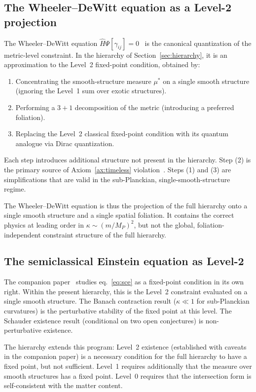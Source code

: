 \documentclass[12pt,a4paper]{article}
\theoremstyle{definition}
\theoremstyle{remark}
\begin{document}
\subsection{The Wheeler--DeWitt equation as a Level-2 projection}

The Wheeler--DeWitt equation $\hat{H}\Psi[\gamma_{ij}] = 0$~\cite{dewitt} is
the canonical quantization of the metric-level constraint. In the hierarchy of
Section~\ref{sec:hierarchy}, it is an approximation to the Level~2 fixed-point
condition, obtained by:

\begin{enumerate}
\item Concentrating the smooth-structure measure $\mu^*$ on a single smooth
structure (ignoring the Level~1 sum over exotic structures).
\item Performing a $3+1$ decomposition of the metric (introducing a preferred
foliation).
\item Replacing the Level~2 classical fixed-point condition with its quantum
analogue via Dirac quantization.
\end{enumerate}

Each step introduces additional structure not present in the hierarchy. Step (2)
is the primary source of Axiom~\ref{ax:timeless} violation~\cite{kuchar}.
Steps (1) and (3) are simplifications
that are valid in the sub-Planckian, single-smooth-structure regime.

The Wheeler--DeWitt equation is thus the projection of the full hierarchy onto
a single smooth structure and a single spatial foliation. It contains the
correct physics at leading order in $\kappa \sim (m/M_P)^2$, but not the
global, foliation-independent constraint structure of the full hierarchy.

\subsection{The semiclassical Einstein equation as Level-2}

The companion paper~\cite{fixed_point} studies eq.~\eqref{eq:sce} as a
fixed-point condition in its own right. Within the present hierarchy, this is
the Level~2 constraint evaluated on a single smooth structure. The Banach
contraction result ($\kappa \ll 1$ for sub-Planckian curvatures) is the
perturbative stability of the fixed point at this level. The Schauder existence
result (conditional on two open conjectures) is non-perturbative existence.

The hierarchy extends this program: Level~2 existence (established with caveats
in the companion paper) is a necessary condition for the full hierarchy to have
a fixed point, but not sufficient. Level~1 requires additionally that the
measure over smooth structures has a fixed point. Level~0 requires that the
intersection form is self-consistent with the matter content.
\end{document}
